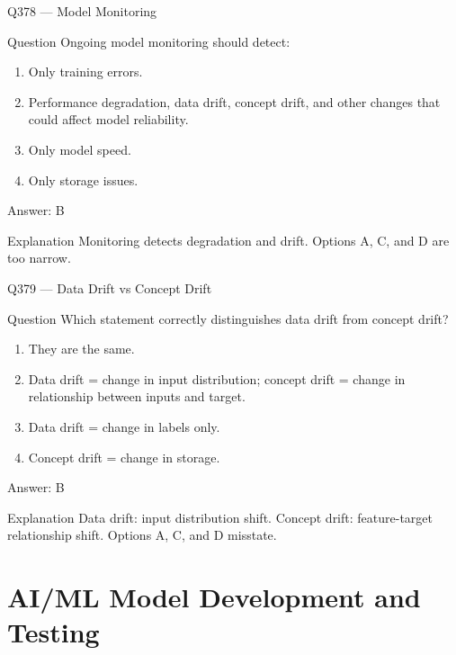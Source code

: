 \documentclass[aspectratio=169,8pt]{beamer}
\begin{document}
	
	\begin{frame}{Q378 --- Model Monitoring}
		\begin{block}{Question}
			Ongoing model monitoring should detect:
			\begin{enumerate}
				\item Only training errors.
				\item Performance degradation, data drift, concept drift, and other changes that could affect model reliability.
				\item Only model speed.
				\item Only storage issues.
			\end{enumerate}
		\end{block}
		\begin{exampleblock}{Answer: B}\end{exampleblock}
		\begin{block}{Explanation}
			Monitoring detects degradation and drift. Options A, C, and D are too narrow.
		\end{block}
	\end{frame}
	
	\begin{frame}{Q379 --- Data Drift vs Concept Drift}
		\begin{block}{Question}
			Which statement correctly distinguishes data drift from concept drift?
			\begin{enumerate}
				\item They are the same.
				\item Data drift = change in input distribution; concept drift = change in relationship between inputs and target.
				\item Data drift = change in labels only.
				\item Concept drift = change in storage.
			\end{enumerate}
		\end{block}
		\begin{exampleblock}{Answer: B}\end{exampleblock}
		\begin{block}{Explanation}
			Data drift: input distribution shift. Concept drift: feature-target relationship shift. Options A, C, and D misstate.
		\end{block}
	\end{frame}
	

	\section{AI/ML Model Development and Testing}
	
\end{document}
